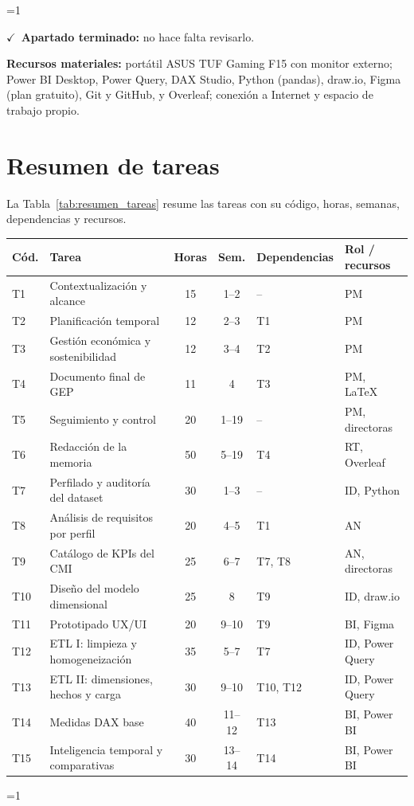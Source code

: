 \documentclass[12pt, a4paper, oneside]{report}
\newcommand{\mostrarterminados}{1}
\newenvironment{revisado}
  {\ifnum\mostrarterminados=1\relax\begin{cajarevisada}\noindent\colorbox{verdeterminado}{\parbox{\dimexpr\linewidth-2\fboxsep\relax}{\small$\checkmark$\ \textbf{Apartado terminado:} no hace falta revisarlo.}}\par\medskip\fi}
  {\ifnum\mostrarterminados=1\relax\end{cajarevisada}\fi}
\begin{document}
\begin{revisado}
\textbf{Recursos materiales:} portátil ASUS TUF Gaming F15 con monitor externo; Power BI Desktop, Power Query, DAX Studio, Python (pandas), draw.io, Figma (plan gratuito), Git y GitHub, y Overleaf; conexión a Internet y espacio de trabajo propio.

\section{Resumen de tareas}
La Tabla~\ref{tab:resumen_tareas} resume las tareas con su código, horas, semanas, dependencias y recursos.

\begin{table}[H]
\centering
\footnotesize
\renewcommand{\arraystretch}{1.0}
\setlength{\tabcolsep}{3.5pt}
\begin{tabularx}{\textwidth}{@{} l X c c l l @{}}
\toprule
\textbf{Cód.} & \textbf{Tarea} & \textbf{Horas} & \textbf{Sem.} & \textbf{Dependencias} & \textbf{Rol / recursos} \\ \midrule
T1 & Contextualización y alcance & 15 & 1--2 & -- & PM \\
T2 & Planificación temporal & 12 & 2--3 & T1 & PM \\
T3 & Gestión económica y sostenibilidad & 12 & 3--4 & T2 & PM \\
T4 & Documento final de GEP & 11 & 4 & T3 & PM, \LaTeX \\
T5 & Seguimiento y control & 20 & 1--19 & -- & PM, directoras \\
T6 & Redacción de la memoria & 50 & 5--19 & T4 & RT, Overleaf \\
T7 & Perfilado y auditoría del dataset & 30 & 1--3 & -- & ID, Python \\
T8 & Análisis de requisitos por perfil & 20 & 4--5 & T1 & AN \\
T9 & Catálogo de KPIs del CMI & 25 & 6--7 & T7, T8 & AN, directoras \\
T10 & Diseño del modelo dimensional & 25 & 8 & T9 & ID, draw.io \\
T11 & Prototipado UX/UI & 20 & 9--10 & T9 & BI, Figma \\
T12 & ETL I: limpieza y homogeneización & 35 & 5--7 & T7 & ID, Power Query \\
T13 & ETL II: dimensiones, hechos y carga & 30 & 9--10 & T10, T12 & ID, Power Query \\
T14 & Medidas DAX base & 40 & 11--12 & T13 & BI, Power BI \\
T15 & Inteligencia temporal y comparativas & 30 & 13--14 & T14 & BI, Power BI \\

\end{tabularx}
\end{table}
\end{revisado}
\end{document}

